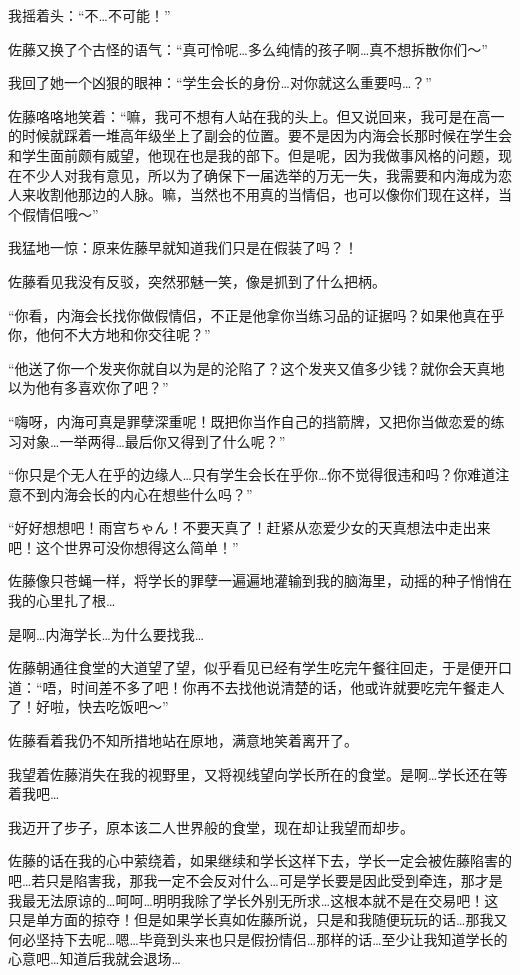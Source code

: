 我摇着头：“不…不可能！”

佐藤又换了个古怪的语气：“真可怜呢…多么纯情的孩子啊…真不想拆散你们～”

我回了她一个凶狠的眼神：“学生会长的身份…对你就这么重要吗…？”

佐藤咯咯地笑着：“嘛，我可不想有人站在我的头上。但又说回来，我可是在高一的时候就踩着一堆高年级坐上了副会的位置。要不是因为内海会长那时候在学生会和学生面前颇有威望，他现在也是我的部下。但是呢，因为我做事风格的问题，现在不少人对我有意见，所以为了确保下一届选举的万无一失，我需要和内海成为恋人来收割他那边的人脉。嘛，当然也不用真的当情侣，也可以像你们现在这样，当个假情侣哦～”

我猛地一惊：原来佐藤早就知道我们只是在假装了吗？！

佐藤看见我没有反驳，突然邪魅一笑，像是抓到了什么把柄。

“你看，内海会长找你做假情侣，不正是他拿你当练习品的证据吗？如果他真在乎你，他何不大方地和你交往呢？”

“他送了你一个发夹你就自以为是的沦陷了？这个发夹又值多少钱？就你会天真地以为他有多喜欢你了吧？”

“嗨呀，内海可真是罪孽深重呢！既把你当作自己的挡箭牌，又把你当做恋爱的练习对象…一举两得…最后你又得到了什么呢？”

“你只是个无人在乎的边缘人…只有学生会长在乎你…你不觉得很违和吗？你难道注意不到内海会长的内心在想些什么吗？”

“好好想想吧！雨宫ちゃん！不要天真了！赶紧从恋爱少女的天真想法中走出来吧！这个世界可没你想得这么简单！”

佐藤像只苍蝇一样，将学长的罪孽一遍遍地灌输到我的脑海里，动摇的种子悄悄在我的心里扎了根…

是啊…内海学长…为什么要找我…

佐藤朝通往食堂的大道望了望，似乎看见已经有学生吃完午餐往回走，于是便开口道：“唔，时间差不多了吧！你再不去找他说清楚的话，他或许就要吃完午餐走人了！好啦，快去吃饭吧～”

佐藤看着我仍不知所措地站在原地，满意地笑着离开了。

我望着佐藤消失在我的视野里，又将视线望向学长所在的食堂。是啊…学长还在等着我吧…

我迈开了步子，原本该二人世界般的食堂，现在却让我望而却步。

佐藤的话在我的心中萦绕着，如果继续和学长这样下去，学长一定会被佐藤陷害的吧…若只是陷害我，那我一定不会反对什么…可是学长要是因此受到牵连，那才是我最无法原谅的…呵呵…明明我除了学长外别无所求…这根本就不是在交易吧！这只是单方面的掠夺！但是如果学长真如佐藤所说，只是和我随便玩玩的话…那我又何必坚持下去呢…嗯…毕竟到头来也只是假扮情侣…那样的话…至少让我知道学长的心意吧…知道后我就会退场…

